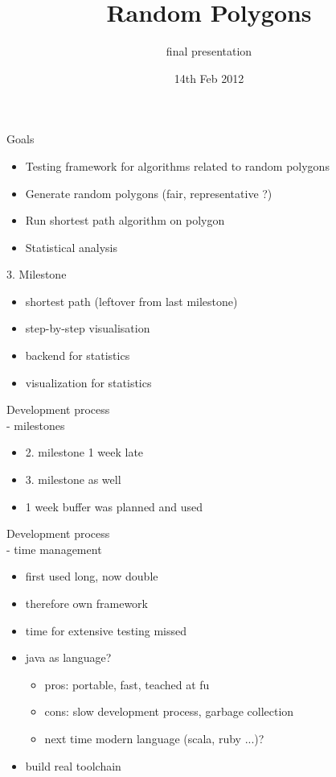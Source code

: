 \documentclass[ucs,9ptb]{beamer}
\title[Random Polygons]{Random Polygons}
\subtitle{final presentation}
\institute[FU Berlin]{Freie Universität Berlin}
\date[14.02.2012]{14th Feb 2012}
\begin{document}
\begin{frame}[plain]
  \titlepage
\end{frame}


\begin{frame}{Goals}
	\begin{itemize}
	\item Testing framework for algorithms related to random polygons
	\item Generate random polygons (fair, representative ?)
	\item Run shortest path algorithm on polygon
	\item Statistical analysis
	\end{itemize}
\end{frame}

\begin{frame}{3. Milestone}
  \begin{itemize}
  \item shortest path (leftover from last milestone)
  \item step-by-step visualisation
  \item backend for statistics
  \item visualization for statistics
  \end{itemize}
\end{frame}

\begin{frame}{Development process\\- milestones}
  \begin{itemize}
    \item 2. milestone 1 week late
    \item 3. milestone as well
    \item 1 week buffer was planned and used
  \end{itemize}
\end{frame}

\begin{frame}{Development process\\- time management}
  \begin{itemize}
    \item first used long, now double
    \item therefore own framework
    \item time for extensive testing missed
    \item java as language?
    \begin{itemize}
      \item pros: portable, fast, teached at fu
      \item cons: slow development process, garbage collection
      \item next time modern language (scala, ruby ...)?
    \end{itemize}
    \item build real toolchain
  \end{itemize}
\end{frame}
\end{document}
